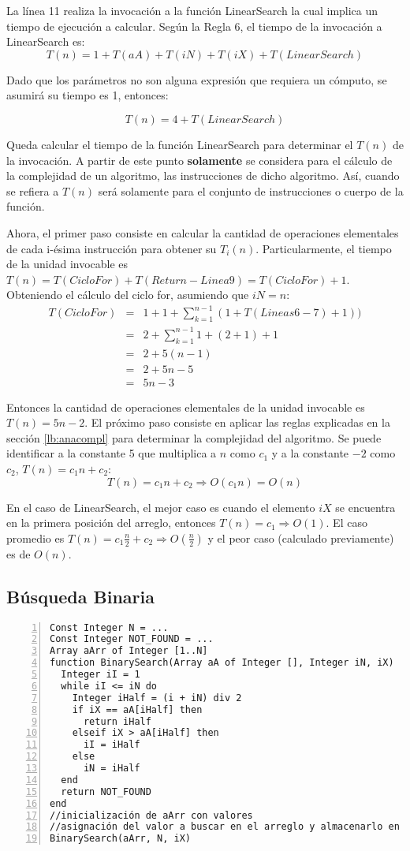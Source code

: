 La línea 11 realiza la invocación a la función LinearSearch la cual implica un tiempo de ejecución a calcular. Según la Regla 6, el tiempo de la invocación a LinearSearch es:
$$T(n) = 1 + T(aA) + T(iN) + T(iX) + T(LinearSearch)$$

Dado que los parámetros no son alguna expresión que requiera un cómputo, se asumirá su tiempo es 1, entonces:

$$T(n) = 4 + T(LinearSearch)$$

Queda calcular el tiempo de la función LinearSearch para determinar el $T(n)$ de la invocación. A partir de este punto \textbf{solamente} se considera para el cálculo de la complejidad de un algoritmo, las instrucciones de dicho algoritmo. Así, cuando se refiera a $T(n)$ será solamente para el conjunto de instrucciones o cuerpo de la función.

Ahora, el primer paso consiste en calcular la cantidad de operaciones elementales de cada i-ésima instrucción para obtener su $T_i(n)$. Particularmente, el tiempo de la unidad invocable es $T(n) = T(CicloFor) + T(Return-Linea9) = T(CicloFor) + 1$. Obteniendo el cálculo del ciclo for, asumiendo que $iN=n$:
\begin{eqnarray*}
T(CicloFor)&=&1 + 1 + \sum_{k=1}^{n - 1}{(1 + T(Lineas 6-7) + 1))}\\
&=&2 + \sum_{k=1}^{n - 1}{1 + (2 + 1) + 1}\\
&=&2 + 5(n - 1)\\
&=&2 + 5n - 5\\
&=&5n - 3
\end{eqnarray*}

Entonces la cantidad de operaciones elementales de la unidad invocable es $T(n) = 5n - 2$. El próximo paso consiste en aplicar las reglas explicadas en la sección \ref{lb:anacompl} para determinar la complejidad del algoritmo. Se puede identificar a la constante 5 que multiplica a $n$ como $c_1$ y a la constante $-2$ como $c_2$, $T(n) = c_1n + c_2$:
$$T(n) = c_1n + c_2 \Rightarrow O(c_1n) = O(n)$$

En el caso de LinearSearch, el mejor caso es cuando el elemento $iX$ se encuentra en la primera posición del arreglo, entonces $T(n) = c_1 \Rightarrow O(1)$. El caso promedio es $T(n) = c_1\frac{n}{2} + c_2 \Rightarrow O(\frac{n}{2})$ y el peor caso (calculado previamente) es de $O(n)$.

\subsection{Búsqueda Binaria}
\begin{lstlisting}[upquote=true, language=pseudo, numbers=left]
Const Integer N = ...
Const Integer NOT_FOUND = ...
Array aArr of Integer [1..N]
function BinarySearch(Array aA of Integer [], Integer iN, iX)	//iX es el elemento a buscar
  Integer iI = 1
  while iI <= iN do
    Integer iHalf = (i + iN) div 2
    if iX == aA[iHalf] then
      return iHalf
    elseif iX > aA[iHalf] then
      iI = iHalf
    else
      iN = iHalf
  end
  return NOT_FOUND
end
//inicialización de aArr con valores
//asignación del valor a buscar en el arreglo y almacenarlo en iX
BinarySearch(aArr, N, iX)
\end{lstlisting}

